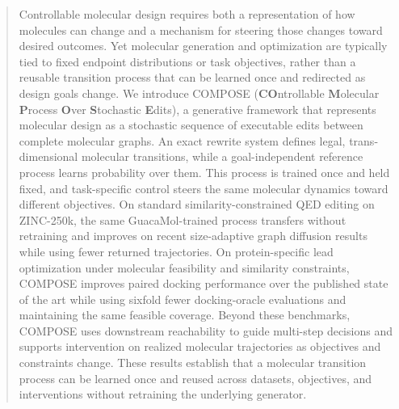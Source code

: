 \begin{abstract}
Controllable molecular design requires both a representation of how molecules can change and a mechanism for steering those changes toward desired outcomes. Yet molecular generation and optimization are typically tied to fixed endpoint distributions or task objectives, rather than a reusable transition process that can be learned once and redirected as design goals change. We introduce COMPOSE (\textbf{CO}ntrollable \textbf{M}olecular \textbf{P}rocess \textbf{O}ver \textbf{S}tochastic \textbf{E}dits), a generative framework that represents molecular design as a stochastic sequence of executable edits between complete molecular graphs. An exact rewrite system defines legal, trans-dimensional molecular transitions, while a goal-independent reference process learns probability over them. This process is trained once and held fixed, and task-specific control steers the same molecular dynamics toward different objectives. On standard similarity-constrained QED editing on ZINC-250k, the same GuacaMol-trained process transfers without retraining and improves on recent size-adaptive graph diffusion results while using fewer returned trajectories. On protein-specific lead optimization under molecular feasibility and similarity constraints, COMPOSE improves paired docking performance over the published state of the art while using sixfold fewer docking-oracle evaluations and maintaining the same feasible coverage. Beyond these benchmarks, COMPOSE uses downstream reachability to guide multi-step decisions and supports intervention on realized molecular trajectories as objectives and constraints change. These results establish that a molecular transition process can be learned once and reused across datasets, objectives, and interventions without retraining the underlying generator.
\end{abstract}
